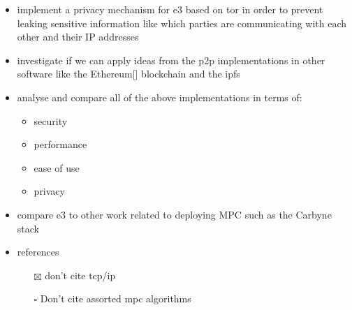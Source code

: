 \documentclass[
]{article}
\providecommand{\tightlist}{%
  \setlength{\itemsep}{0pt}\setlength{\parskip}{0pt}}
\begin{document}
\begin{itemize}
        \begin{itemize}
          \tightlist
          \item
                support sessions - the DIDComm protocol is currently stateless and
                uses a new asymmetric key for each message, which negatively impacts
                performance
          \item
                employ \gls{nat} traversal techniques similar to mesh \glspl{vpn}
        \end{itemize}
  \item
        implement a privacy mechanism for \gls{e3} based on \gls{tor} in order
        to prevent leaking sensitive information like which parties are
        communicating with each other and their IP addresses
  \item
        investigate if we can apply ideas from the \gls{p2p} implementations
        in other software like the
        Ethereum{[}\textcite{ethereumDocs}{]}\autocite{ethereumYellowPaper}
        blockchain and the \gls{ipfs} \autocite{ipfsDocs}
  \item
        analyse and compare all of the above implementations in terms of:

        \begin{itemize}
          \tightlist
          \item
                security
          \item
                performance
          \item
                ease of use
          \item
                privacy
        \end{itemize}
  \item
        compare \gls{e3} to other work related to deploying MPC such as the
        Carbyne stack\autocite{robertboschgmbhCarbyneStack2022}
  \item
        references

        \begin{itemize}
          \tightlist
          \item[$\boxtimes$]
            don't cite tcp/ip
          \item[$\square$]
            Don't cite assorted mpc algorithms


\end{itemize}
\end{itemize}
\end{document}
